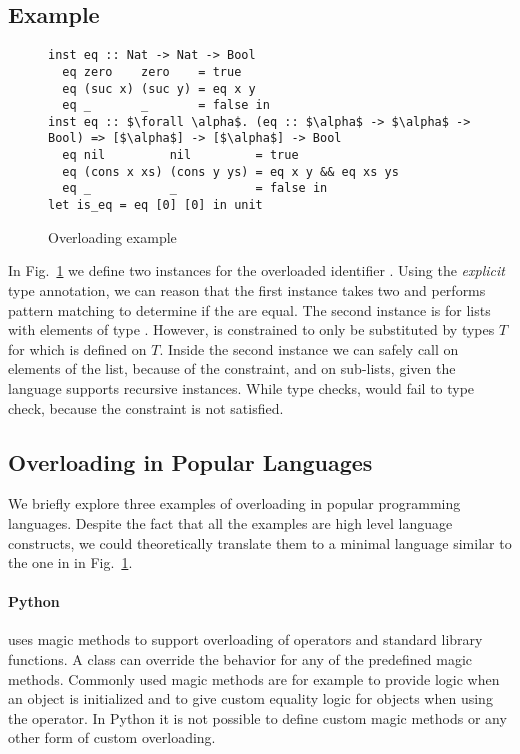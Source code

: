 \documentclass[runningheads]{llncs}
\newcommand{\snip}[1]{\footnotesize{\ttfamily{#1}}}
\begin{document}
\subsection{Example}
  \begin{figure}
    \begin{lstlisting}
inst eq :: Nat -> Nat -> Bool
  eq zero    zero    = true
  eq (suc x) (suc y) = eq x y
  eq _       _       = false in
inst eq :: $\forall \alpha$. (eq :: $\alpha$ -> $\alpha$ -> Bool) => [$\alpha$] -> [$\alpha$] -> Bool
  eq nil         nil         = true
  eq (cons x xs) (cons y ys) = eq x y && eq xs ys
  eq _           _           = false in
let is_eq = eq [0] [0] in unit
    \end{lstlisting}
  \caption{Overloading example} \label{example}
  \end{figure}
\noindent 
In Fig.~\ref{example} we define two instances for the overloaded identifier \snip{eq}. 
Using the \emph{explicit} type annotation, we can reason that the first instance takes two \snip{Nat} and performs pattern matching to determine if the are equal. 
The second instance is for lists with elements of type \snip{$\alpha$}. 
However, \snip{$\alpha$} is constrained to only be substituted by types $T$ for which \snip{eq} is defined on $T$.
Inside the second instance we can safely call \snip{eq} on elements of the list, because of the constraint, and on sub-lists, given the language supports recursive instances. 
While \snip{eq [0] [0]} type checks, \snip{eq [true] [true]} would fail to type check, because the constraint is not satisfied.

\subsection{Overloading in Popular Languages}
We briefly explore three examples of overloading in popular programming languages. 
Despite the fact that all the examples are high level language constructs, we could theoretically translate them to a minimal language similar to the one in in Fig.~\ref{example}. 
\paragraph{Python} uses magic methods to support overloading of operators and standard library functions. 
A class can override the behavior for any of the predefined magic methods.
Commonly used magic methods are for example \snip{\_\_init\_\_(self)} to provide logic when an object is initialized and \snip{\_\_eq\_\_(self, other)} to give custom equality logic for objects when using the \snip{==} operator. 
In Python it is not possible to define custom magic methods or any other form of custom overloading.
\end{document}
